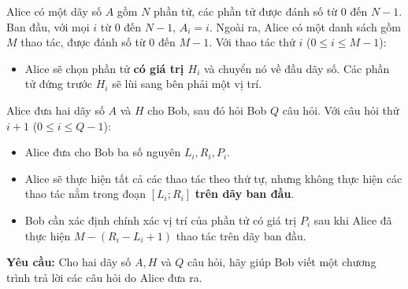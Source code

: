 Alice có một dãy số $A$ gồm $N$ phần tử, các phần tử được đánh số từ $0$ đến $N-1$. Ban đầu, với mọi $i$ từ $0$ đến $N-1$, $A_i=i$. Ngoài ra, Alice có một danh sách gồm $M$ thao tác, được đánh số từ $0$ đến $M-1$. Với thao tác thứ $i$ ($0\le i\le M-1$):
\begin{itemize}
   \item Alice sẽ chọn phần tử \textbf{có giá trị $H_i$} và chuyển nó về đầu dãy số. Các phần tử đứng trước $H_i$ sẽ lùi sang bên phải một vị trí.
\end{itemize}

Alice đưa hai dãy số $A$ và $H$ cho Bob, sau đó hỏi Bob $Q$ câu hỏi. Với câu hỏi thứ $i+1$ ($0\le i\le Q-1$):
\begin{itemize}
   \item Alice đưa cho Bob ba số nguyên $L_i,R_i,P_i$.
   \item Alice sẽ thực hiện tất cả các thao tác theo thứ tự, nhưng không thực hiện các thao tác nằm trong đoạn $[L_i;R_i]$ \textbf{trên dãy ban đầu}.
   \item Bob cần xác định chính xác vị trí của phần tử có giá trị $P_i$ sau khi Alice đã thực hiện $M-(R_i-L_i+1)$ thao tác trên dãy ban đầu.
\end{itemize}

\textbf{Yêu cầu:} Cho hai dãy số $A,H$ và $Q$ câu hỏi, hãy giúp Bob viết một chương trình trả lời các câu hỏi do Alice đưa ra.